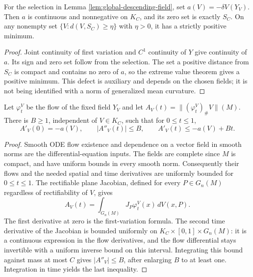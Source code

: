 \begin{lemma}\label{lem:continuous-stationarity-defect}
For the selection in Lemma \ref{lem:global-descending-field}, set $a(V)=-\delta V(Y_V)$. Then $a$ is continuous and nonnegative on $K_C$, and its zero set is exactly $S_C$. On any nonempty set $\{V:d(V,S_C)\geq\eta\}$ with $\eta>0$, it has a strictly positive minimum.
\end{lemma}
\begin{proof}
Joint continuity of first variation and $C^1$ continuity of $Y$ give continuity of $a$. Its sign and zero set follow from the selection. The set a positive distance from $S_C$ is compact and contains no zero of $a$, so the extreme value theorem gives a positive minimum. This defect is auxiliary and depends on the chosen fields; it is not being identified with a norm of generalized mean curvature.
\end{proof}

\begin{lemma}\label{lem:pulltight-flow-taylor}
Let $\varphi_t^V$ be the flow of the fixed field $Y_V$ and let $A_V(t)=\| (\varphi_t^V)_\#V\|(M)$. There is $B\geq1$, independent of $V\in K_C$, such that for $0\leq t\leq1$,
\[
 A'_V(0)=-a(V),\qquad |A''_V(t)|\leq B,\qquad
 A'_V(t)\leq-a(V)+Bt.
\]
\end{lemma}
\begin{proof}
Smooth ODE flow existence and dependence on a vector field in smooth norms are the differential-equation inputs. The fields are complete since $M$ is compact, and have uniform bounds in every smooth norm. Consequently their flows and the needed spatial and time derivatives are uniformly bounded for $0\leq t\leq1$. The rectifiable plane Jacobian, defined for every $P\in G_n(M)$ regardless of rectifiability of $V$, gives
\[
 A_V(t)=\int_{G_n(M)}J_P\varphi_t^V(x)\,dV(x,P).
\]
The first derivative at zero is the first-variation formula. The second time derivative of the Jacobian is bounded uniformly on $K_C\times[0,1]\times G_n(M)$: it is a continuous expression in the flow derivatives, and the flow differential stays invertible with a uniform inverse bound on this interval. Integrating this bound against mass at most $C$ gives $|A''_V|\leq B$, after enlarging $B$ to at least one. Integration in time yields the last inequality.
\end{proof}

